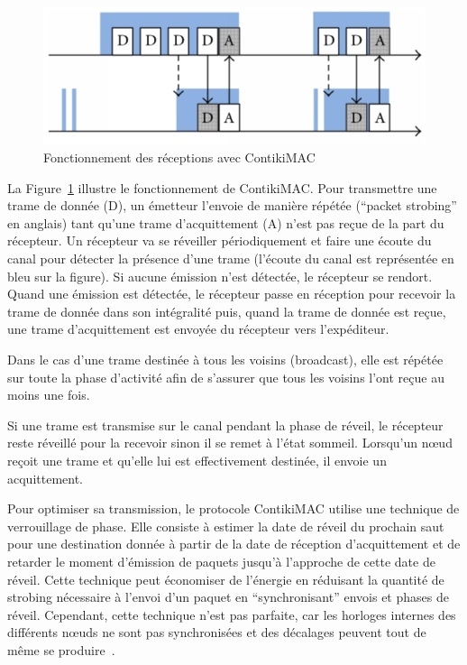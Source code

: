\begin{figure}[ht]
  \centering
  \includegraphics[width=.5\textwidth]{img/contikimac.png}
  \caption{Fonctionnement des réceptions avec ContikiMAC}
  \label{supervision:fig:contikimac}
\end{figure}

La Figure~\ref{supervision:fig:contikimac} illustre le fonctionnement de ContikiMAC.
Pour transmettre une trame de donnée (D), un émetteur l'envoie de manière répétée (``packet strobing'' en anglais) tant qu'une trame d'acquittement (A) n'est pas reçue de la part du récepteur.
Un récepteur va se réveiller périodiquement et faire une écoute du canal pour détecter la présence d'une trame (l'écoute du canal est représentée en bleu sur la figure).
Si aucune émission n'est détectée, le récepteur se rendort.
Quand une émission est détectée, le récepteur passe en réception pour recevoir la trame de donnée dans son intégralité puis, quand la trame de donnée est reçue, une trame d'acquittement est envoyée du récepteur vers l'expéditeur.

Dans le cas d'une trame destinée à tous les voisins (broadcast), elle est répétée sur toute la phase d'activité afin de s’assurer que tous les voisins l’ont reçue au moins une fois.

Si une trame est transmise sur le canal pendant la phase de réveil, le récepteur reste réveillé pour la recevoir sinon il se remet à l’état sommeil.
Lorsqu'un nœud reçoit une trame et qu'elle lui est effectivement destinée, il envoie un acquittement.

Pour optimiser sa transmission, le protocole ContikiMAC utilise une technique de verrouillage de phase.
Elle consiste à estimer la date de réveil du prochain saut pour une destination donnée à partir de la date de réception d’acquittement et de retarder le moment d’émission de paquets jusqu’à l’approche de cette date de réveil.
Cette technique peut économiser de l'énergie en réduisant la quantité de strobing nécessaire à l'envoi d'un paquet en ``synchronisant'' envois et phases de réveil.
Cependant, cette technique n'est pas parfaite, car les horloges internes des différents nœuds ne sont pas synchronisées et des décalages peuvent tout de même se produire~\cite{gonizzi2014rawmac}.

